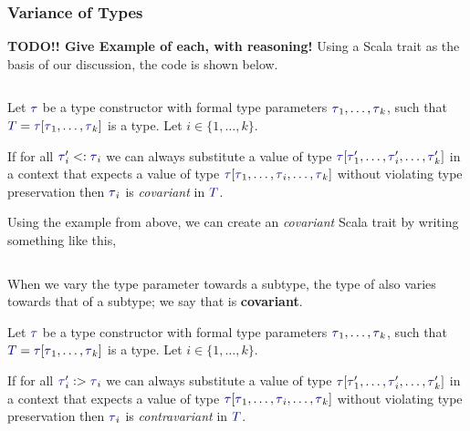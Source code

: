 \subsubsection{Variance of Types}\label{subsubsec:Type_Variance}
\textbf{TODO!! Give Example of each, with reasoning!}
Using a \texttt{} Scala trait as the basis of our discussion, the code is shown below.
\inputminted[frame=lines,linenos]{scala}{./EDAP05-Concepts_Programming_Languages-Sections/Advanced_Data_Types/Code/Box.scala}

\begin{definition}[Covariance]\label{def:Type_Covariance}
  Let $\DataType$ be a type constructor with formal type parameters $\DataType_{1}, \ldots , \DataType_{k}$, such that $\SemanticType{T} = \DataType [\DataType_{1}, \ldots, \DataType_{k}]$ is a type.
  Let $i \in \lbrace 1,\ldots, k \rbrace$.

  If for all $\DataType_{i}' <: \DataType_{i}$ we can always substitute a value of type $\DataType [\DataType_{1}',\ldots, \DataType_{i}', \ldots, \DataType_{k}']$ in a context that expects a value of type $\DataType [\DataType_{1}, \ldots, \DataType_{i}, \ldots, \DataType_{k}]$ without violating type preservation then $\DataType_{i}$ is \emph{covariant} in $\SemanticType{T}$.

  Using the  example from above, we can create an \emph{covariant} Scala trait by writing something like this,
  \inputminted[frame=lines,linenos]{scala}{./EDAP05-Concepts_Programming_Languages-Sections/Advanced_Data_Types/Code/CovariantBox.scala}
  When we vary the type parameter  towards a subtype, the type of  also varies towards that of a subtype; we say that  is \textbf{covariant}.
\end{definition}

\begin{definition}[Contravariance]\label{Type_Contravariance}
  Let $\DataType$ be a type constructor with formal type parameters $\DataType_{1}, \ldots , \DataType_{k}$, such that $\SemanticType{T} = \DataType [\DataType_{1}, \ldots, \DataType_{k}]$ is a type.
  Let $i \in \lbrace 1,\ldots, k \rbrace$.

  If for all $\DataType_{i}' :> \DataType_{i}$ we can always substitute a value of type $\DataType [\DataType_{1}',\ldots, \DataType_{i}', \ldots, \DataType_{k}']$ in a context that expects a value of type $\DataType [\DataType_{1}, \ldots, \DataType_{i}, \ldots, \DataType_{k}]$ without violating type preservation then $\DataType_{i}$ is \emph{contravariant} in $\SemanticType{T}$.
\end{definition}


